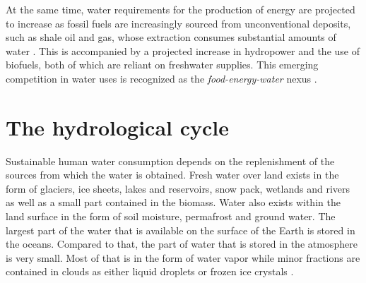 At the same time, water requirements for the production of energy are projected
to increase as fossil fuels are increasingly sourced from unconventional
deposits, such as shale oil and gas, whose extraction consumes substantial
amounts of water \citep{rosa18}. This is accompanied by a projected increase in
hydropower \citep{zarfl15} and the use of biofuels, both of which are reliant
on freshwater supplies. This emerging competition in water uses is recognized as
the \textit{food-energy-water} nexus \citep{dodorico18}.



%
%


\section{The hydrological cycle}

Sustainable human water consumption depends on the replenishment of the sources
from which the water is obtained. Fresh water over land exists in the form of
glaciers, ice sheets, lakes and reservoirs, snow pack, wetlands and rivers as
well as a small part contained in the biomass. Water also exists within the land
surface in the form of soil moisture, permafrost and ground water. The largest
part of the water that is available on the surface of the Earth is stored in the
oceans. Compared to that, the part of water that is stored in the atmosphere is
very small. Most of that is in the form of water vapor while minor fractions are
contained in clouds as either liquid droplets or frozen ice
crystals \citep{abbott19}.

